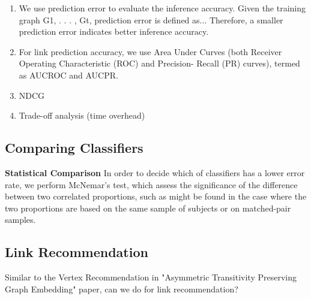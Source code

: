 \begin{enumerate}
    \item We use prediction error to evaluate the inference accuracy. Given the training graph G1, . . . , Gt, prediction error is defined as... Therefore, a smaller prediction error indicates better inference accuracy.
    
    \item For link prediction accuracy, we use Area Under Curves
(both Receiver Operating Characteristic (ROC) and Precision-
Recall (PR) curves), termed as AUCROC and AUCPR.

    \item NDCG
    
    \item Trade-off analysis (time overhead)
    
\end{enumerate}


\subsection{Comparing Classifiers}


\textbf{Statistical Comparison} In order to decide which of classifiers has a lower error rate, we perform McNemar's test, which assess the significance of the difference between two correlated proportions, such as might be found in the case where the two proportions are based on the same sample of subjects or on matched-pair samples.


\subsection{Link Recommendation}

Similar to the Vertex Recommendation in "Asymmetric Transitivity Preserving Graph Embedding" paper, can we do for link recommendation?


